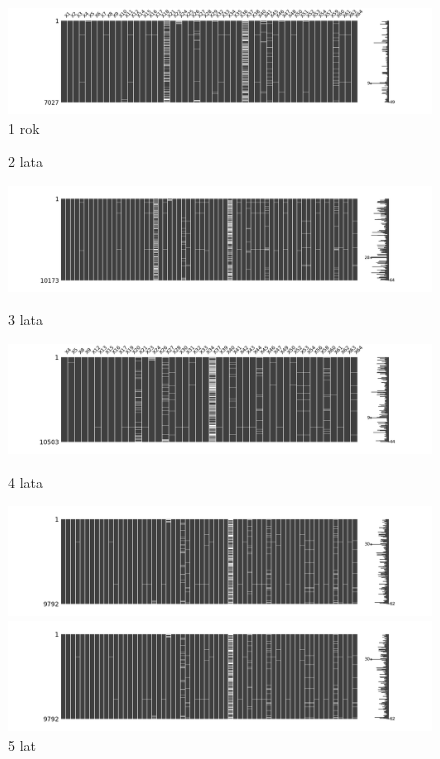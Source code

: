 \documentclass[11pt]{article}
\begin{document}
\begin{figure}[h]
\caption{1 rok}
	\includegraphics[width=\textwidth]{year_1}
\end{figure}
\begin{figure}[p]
\caption{2 lata}
	\includegraphics[width=\textwidth]{year_2}
\caption{3 lata}
	\includegraphics[width=\textwidth]{year_3}
\caption{4 lata}
	\includegraphics[width=\textwidth]{year_4}
\caption{5 lat}
	\includegraphics[width=\textwidth]{year_5}
\end{figure}
\end{document}
